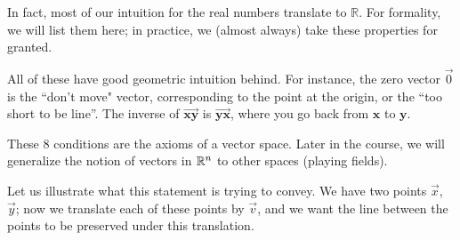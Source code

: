 In fact, most of our intuition for the real numbers translate to $\mathbb{R}$. For formality, we will list them here; in practice, we (almost always) take these properties for granted.
\begin{remark}
	All of these have good geometric intuition behind. For instance, the zero vector $\vec{0}$ is the ``don't move" vector, corresponding to the point at the origin, or the ``too short to be line''. The inverse of $\overrightarrow{\mathbf{xy}}$ is $\overrightarrow{\mathbf{yx}}$, where you go back from $\mathbf{x}$ to $\mathbf{y}$. \begin{tikzpicture}
		
	\end{tikzpicture}
\end{remark}
\begin{remark}
	These $8$ conditions are the axioms of a vector space. Later in the course, we will generalize the notion of vectors in $\reals^n$ to other spaces (playing fields).
\end{remark}
Let us illustrate what this statement is trying to convey. We have two points $\vec{x}$, $\vec{y}$; now we translate each of these points by $\vec{v}$, and we want the line between the points to be preserved under this translation.\\
